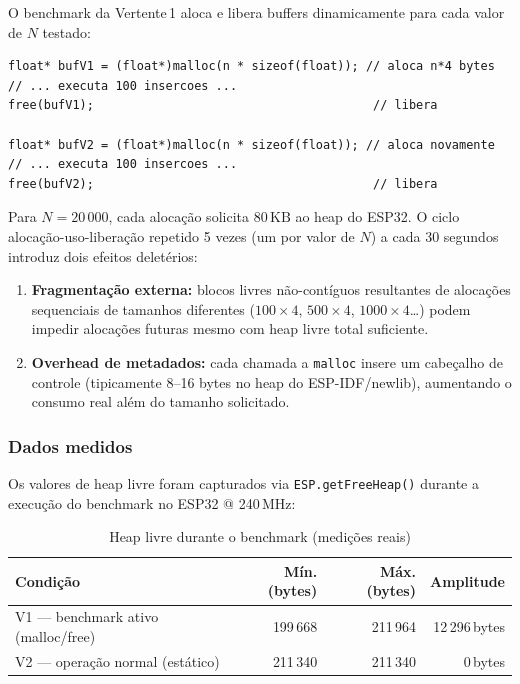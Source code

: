 \documentclass[12pt, a4paper]{article}
\theoremstyle{definition}
\theoremstyle{remark}
\begin{document}
O benchmark da Vertente\,1 aloca e libera buffers dinamicamente para cada
valor de $N$ testado:

\begin{lstlisting}[caption={Ciclo de alocação/liberação no benchmark V1}]
float* bufV1 = (float*)malloc(n * sizeof(float)); // aloca n*4 bytes
// ... executa 100 insercoes ...
free(bufV1);                                       // libera

float* bufV2 = (float*)malloc(n * sizeof(float)); // aloca novamente
// ... executa 100 insercoes ...
free(bufV2);                                       // libera
\end{lstlisting}

Para $N = 20\,000$, cada alocação solicita $80\,\text{KB}$ ao heap do ESP32.
O ciclo alocação-uso-liberação repetido 5 vezes (um por valor de $N$) a cada
30 segundos introduz dois efeitos deletérios:

\begin{enumerate}
  \item \textbf{Fragmentação externa:} blocos livres não-contíguos resultantes
    de alocações sequenciais de tamanhos diferentes ($100 \times 4$,
    $500 \times 4$, $1000 \times 4$\ldots) podem impedir alocações futuras
    mesmo com heap livre total suficiente.

  \item \textbf{Overhead de metadados:} cada chamada a \texttt{malloc} insere
    um cabeçalho de controle (tipicamente 8--16 bytes no heap do
    ESP-IDF/newlib), aumentando o consumo real além do tamanho solicitado.
\end{enumerate}

\subsubsection{Dados medidos}

Os valores de heap livre foram capturados via \texttt{ESP.getFreeHeap()}
durante a execução do benchmark no ESP32 @ 240\,MHz:

\begin{table}[H]
  \centering
  \caption{Heap livre durante o benchmark (medições reais)}
  \label{tab:heap}
  \begin{tabular}{lrrr}
    \toprule
    Condição & Mín. (bytes) & Máx. (bytes) & Amplitude \\
    \midrule
    V1 — benchmark ativo (malloc/free) & 199\,668 & 211\,964 & 12\,296\,bytes \\
    V2 — operação normal (estático)    & 211\,340 & 211\,340 & 0\,bytes \\
    \bottomrule
  \end{tabular}
\end{table}
\end{document}
